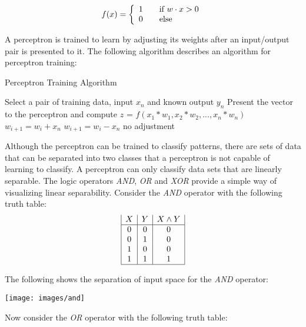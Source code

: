 \[
  f(x) = \left\{ 
  \begin{array}{l l}
    1 & \quad \text{if $w \cdot x > 0$}\\
    0 & \quad \text{else}\\
  \end{array} \right.
\]

A perceptron is trained to learn by adjusting its weights after an input/output pair is presented to it.
The following algorithm describes an algorithm for perceptron training:

\begin{algorithm}
\caption{Perceptron Training Algorithm}
\label{perceptronAlg}    
\begin{algorithmic}

\STATE Select a pair of training data, input $x_n$ and known output $y_n$
\STATE Present the vector to the perceptron and compute $z$ = $f(x_1 * w_1, x_2 * w_2, ..., x_n * w_n)$
\STATE $w_{i+1} = w_i + x_n$
\STATE $w_{i+1} = w_i - x_n$
 \ELSE
\STATE no adjustment
\ENDIF
\ENDWHILE
\end{algorithmic}
\end{algorithm}

Although the perceptron can be trained to classify patterns, there are sets of data that can be separated into two classes that a perceptron is not capable of learning to classify.
A perceptron can only classify data sets that are linearly separable.
The logic operators {\it AND}, {\it OR} and {\it XOR} provide a simple way of visualizing linear separability.
Consider the {\it AND} operator with the following truth table: 
\begin{displaymath}
\begin{array}{|c|c|c|}
   X
 & Y
 & X \land Y
\\
\hline
0 & 0 & 0\\
0 & 1 & 0\\
1 & 0 & 0\\
1 & 1 & 1\\
\hline
\end{array}
\end{displaymath}

The following shows the separation of input space for the {\it AND} operator:

\texttt{[image: images/and]}

Now consider the {\it OR} operator with the following truth table:

